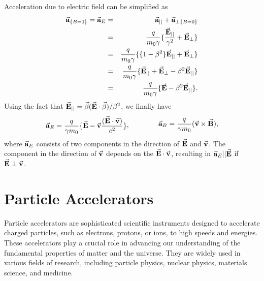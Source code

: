 \documentclass[a4paper,oneside,12pt]{report}
\numberwithin{equation}{chapter}
\begin{document}
Acceleration due to electric field can be simplified as
\vspace{-10pt}
\begin{eqnarray}
    \vecthreeBF{a}_{\{B=0\}} = \vecthreeBF{a}_{E}   &=&  \vecthreeBF{a}_{||} + \vecthreeBF{a}_{\perp \{B=0\}} \nonumber \\
                                &=& \frac{q}{m_0 \gamma} \{ \frac{\vecthreeBF{E}_{||}}{\gamma^2} + \vecthreeBF{E}_{\perp} \} \nonumber\\
                                &=& \frac{q}{m_0 \gamma} \{ \{1 - \beta^2\}\vecthreeBF{E}_{||} + \vecthreeBF{E}_{\perp} \} \nonumber\\
                                &=& \frac{q}{m_0 \gamma} \{ \vecthreeBF{E}_{||} + \vecthreeBF{E}_{\perp}-\beta^2\vecthreeBF{E}_{||} \} \nonumber\\
                                &=& \frac{q}{m_0 \gamma} \{ \vecthreeBF{E} - \beta^2\vecthreeBF{E}_{||} \} .
                                \vspace{-10pt}
\end{eqnarray}
Using the fact that $\vec{\textbf{E}}_{||} = \vec{\beta}(\vec{\textbf{E}} \cdot \vec{\beta})/\beta^2 $, we finally have
\vspace{-10pt}
\begin{equation} \label{eq:acc_of_E_and_B}
    \begin{aligned}
        \vecthreeBF{a}_{E} = \frac{q}{ \gamma m_0} \{ \vecthreeBF{E} - \vecthreeBF{v}\frac{(\dotProdBF{E}{v})}{c^2} \}
    \end{aligned}  ,
    \qquad \qquad
    \begin{aligned}
        \vecthreeBF{a}_{B} = \frac{q}{\gamma m_0} ( \crossProdBF{v}{B} ) ,
    \end{aligned}
    \vspace{-10pt}
\end{equation}
where $\vec{\textbf{a}}_{E}$ consists of two components in the direction of $\vec{\textbf{E}}$ and $\vec{\textbf{v}}$.
The component in the direction of $\vec{\textbf{v}}$ depends on the $\vec{\textbf{E}} \cdot \vec{\textbf{v}}$, 
resulting in $\vec{\textbf{a}}_{E} || \vec{\textbf{E}}$ if $\vec{\textbf{E}} \perp \vec{\textbf{v}}$.


\section{Particle Accelerators}

Particle accelerators are sophisticated scientific instruments designed to accelerate charged particles, such as electrons, protons, or ions, to high speeds and energies. 
These accelerators play a crucial role in advancing our understanding of the fundamental properties of matter and the universe. 
They are widely used in various fields of research, including particle physics, nuclear physics, materials science, and medicine.
\end{document}
